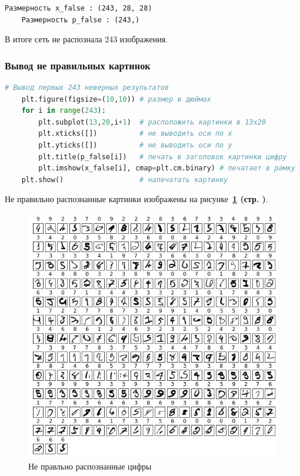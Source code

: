 \begin{lstlisting}[name=Вывод в консоль,]
    Размерность x_false : (243, 28, 28)
    Размерность p_false : (243,)
\end{lstlisting}

В итоге сеть не распознала 243 изображения.



\subsubsection{Вывод не правильных картинок}

\begin{lstlisting}[language=Python,]
    # Вывод первых 243 неверных результатов
    plt.figure(figsize=(10,10)) # размер в дюймах
    for i in range(243):
        plt.subplot(13,20,i+1)  # расположить картинки в 13x20
        plt.xticks([])          # не выводить оси по x
        plt.yticks([])          # не выводить оси по y
        plt.title(p_false[i])   # печать в заголовок картинки цифру
        plt.imshow(x_false[i], cmap=plt.cm.binary) # печатает в рамку
    plt.show()                  # напечатать картинку
\end{lstlisting}

Не правильно распознанные картинки изображены на
рисунке~\textbf{\ref{fig:4_not_right_imgs} (стр. \pageref{fig:4_not_right_imgs})}.

\begin{figure}[!htbp]
    \centering
    \includegraphics[width=16cm]
    {../_INCLUDES/main/4/not_right_imgs.png}
    \caption{Не правльно распознанные цифры}
    \label{fig:4_not_right_imgs}
\end{figure}